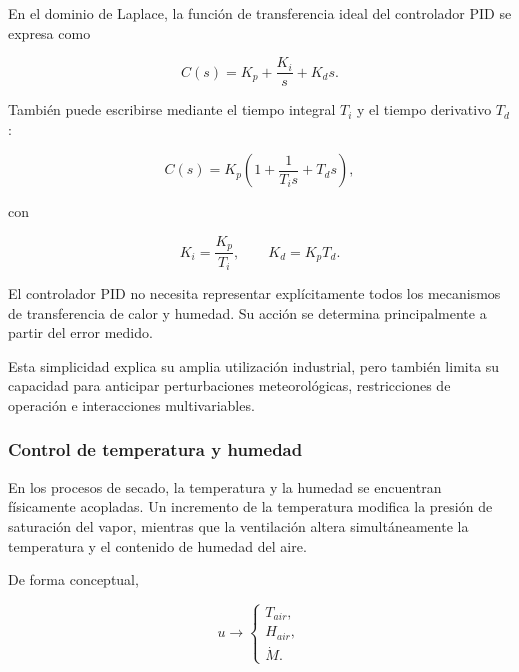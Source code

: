 En el dominio de Laplace, la función de transferencia ideal del controlador PID se expresa como

\begin{equation}
C(s)
=
K_p
+
\frac{K_i}{s}
+
K_d s.
\end{equation}

También puede escribirse mediante el tiempo integral $T_i$ y el tiempo derivativo $T_d$:

\begin{equation}
C(s)
=
K_p
\left(
1+
\frac{1}{T_i s}
+
T_d s
\right),
\end{equation}

con

\begin{equation}
K_i=\frac{K_p}{T_i},
\qquad
K_d=K_pT_d.
\end{equation}

\begin{tcolorbox}[
title=Interpretación del control PID,
colback=blue!4,
colframe=blue!65!black
]
El controlador PID no necesita representar explícitamente todos los mecanismos de transferencia de calor y humedad. Su acción se determina principalmente a partir del error medido.

Esta simplicidad explica su amplia utilización industrial, pero también limita su capacidad para anticipar perturbaciones meteorológicas, restricciones de operación e interacciones multivariables.
\end{tcolorbox}

\subsubsection{Control de temperatura y humedad}

En los procesos de secado, la temperatura y la humedad se encuentran físicamente acopladas. Un incremento de la temperatura modifica la presión de saturación del vapor, mientras que la ventilación altera simultáneamente la temperatura y el contenido de humedad del aire.

De forma conceptual,

\begin{equation}
u
\longrightarrow
\begin{cases}
T_{air},\\
H_{air},\\
\dot{M}.
\end{cases}
\end{equation}

